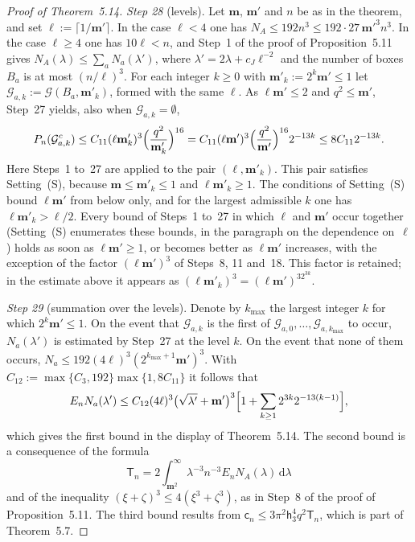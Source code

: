 \documentclass[11pt]{amsart}
\theoremstyle{definition}
\begin{document}
\begin{proof}[Proof of Theorem~5.14]
\emph{Step 28} (levels).
Let $\mathbf m$, $\mathbf m'$ and $n$ be as in the theorem, and set $\ell:=\lceil1/\mathbf m'\rceil$.
In the case $\ell<4$ one has $N_A\le192n^3\le192\cdot27\,\mathbf m'^3n^3$.
In the case $\ell\ge4$ one has $10\ell<n$, and Step~1 of the proof of Proposition~5.11 gives $N_A(\lambda)\le\sum_aN_a(\lambda')$, where $\lambda'=2\lambda+c_J\ell^{-2}$ and the number of boxes $B_a$ is at most $(n/\ell)^3$.
For each integer $k\ge0$ with $\mathbf m'_k:=2^k\mathbf m'\le1$ let $\mathcal G_{a,k}:=\mathcal G(B_a,\mathbf m'_k)$, formed with the same $\ell$.
As $\ell\mathbf m'\le2$ and $q^2\le\mathbf m'$, Step~27 yields, also when $\mathcal G_{a,k}=\emptyset$,
\begin{equation*}
P_n(\mathcal G_{a,k}^c)\le C_{11}(\ell\mathbf m'_k)^3\Bigl(\frac{q^2}{\mathbf m'_k}\Bigr)^{16}=C_{11}(\ell\mathbf m')^3\Bigl(\frac{q^2}{\mathbf m'}\Bigr)^{16}2^{-13k}\le8C_{11}2^{-13k}.
\end{equation*}
Here Steps~1 to~27 are applied to the pair $(\ell,\mathbf m'_k)$.
This pair satisfies Setting~(S), because $\mathbf m\le\mathbf m'_k\le1$ and $\ell\mathbf m'_k\ge1$.
The conditions of Setting~(S) bound $\ell\mathbf m'$ from below only, and for the largest admissible $k$ one has $\ell\mathbf m'_k>\ell/2$.
Every bound of Steps~1 to~27 in which $\ell$ and $\mathbf m'$ occur together (Setting~(S) enumerates these bounds, in the paragraph on the dependence on~$\ell$) holds as soon as $\ell\mathbf m'\ge1$, or becomes better as $\ell\mathbf m'$ increases, with the exception of the factor $(\ell\mathbf m')^3$ of Steps~8, 11 and~18.
This factor is retained; in the estimate above it appears as $(\ell\mathbf m'_k)^3=(\ell\mathbf m')^32^{3k}$.

\emph{Step 29} (summation over the levels).
Denote by $k_{\max}$ the largest integer $k$ for which $2^k\mathbf m'\le1$.
On the event that $\mathcal G_{a,k}$ is the first of $\mathcal G_{a,0},\dots,\mathcal G_{a,k_{\max}}$ to occur, $N_a(\lambda')$ is estimated by Step~27 at the level $k$.
On the event that none of them occurs, $N_a\le192(4\ell)^3(2^{k_{\max}+1}\mathbf m')^3$.
With $C_{12}:=\max\{C_3,192\}\max\{1,8C_{11}\}$ it follows that
\begin{equation*}
E_nN_a(\lambda')\le C_{12}(4\ell)^3\bigl(\sqrt{\lambda'}+\mathbf m'\bigr)^3\Bigl[1+\sum_{k\ge1}2^{3k}2^{-13(k-1)}\Bigr],
\end{equation*}
which gives the first bound in the display of Theorem~5.14.
The second bound is a consequence of the formula
\begin{equation*}
\mathsf T_n=2\int_{\mathbf m^2}^\infty\lambda^{-3}n^{-3}E_nN_A(\lambda)\,\mathrm d\lambda
\end{equation*}
and of the inequality $(\xi+\zeta)^3\le4(\xi^3+\zeta^3)$, as in Step~8 of the proof of Proposition~5.11.
The third bound results from $\mathsf c_n\le3\pi^2\mathsf h_3^4q^2\mathsf T_n$, which is part of Theorem~5.7.


\end{proof}
\end{document}
